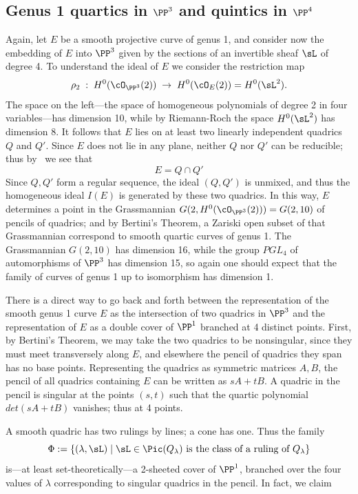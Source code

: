\subsection{Genus 1 quartics in $\PP^3$ and quintics in $\PP^4$} \label{g=1 in P3,P4}

Again, let $E$ be a smooth projective curve of genus 1, and consider now the embedding of $E$ into $\PP^3$ given by the sections of an invertible sheaf $\sL$ of degree 4. To understand the ideal of $E$ we consider the restriction map
$$
\rho_2 \;  : \; H^0(\cO_{\PP^3}(2)) \; \to \; H^0(\cO_{E}(2)) = H^0(\sL^2).
$$
The space on the left---the space of homogeneous polynomials of degree 2 in four variables---has dimension 10, while by Riemann-Roch the space $H^0(\sL^2)$ has dimension 8. It follows that $E$ lies on at least two linearly independent quadrics $Q$ and $Q'$. Since $E$ does not lie in any plane, neither $Q$ nor $Q'$ can be reducible; thus by \bt\ we see that
$$
E = Q \cap Q'
$$
Since $Q,Q'$ form a regular sequence, the ideal $(Q,Q')$ is unmixed, and thus the homogeneous ideal $I(E)$ is generated by
these two quadrics. In this way, $E$ determines a point in the Grassmannian $G(2, H^0(\cO_{\PP^3}(2))) = G(2, 10)$ of pencils of quadrics; and by Bertini's Theorem, a Zariski open subset of that Grassmannian correspond to smooth quartic curves of genus 1. The Grassmannian $G(2,10)$ has dimension 16, while the group $PGL_4$ of automorphisms of $\PP^3$ has dimension 15, so again one should expect that the family of curves of genus 1 up to isomorphism has dimension 1.

There is a direct way to go back and forth between the representation of the smooth genus 1 curve $E$ as the intersection of two quadrics in $\PP^3$ and the representation of $E$ as a double cover
of $\PP^1$ branched at 4 distinct points. First, by Bertini's Theorem, we may take the two quadrics to be nonsingular, since they must meet transversely along $E$, and elsewhere the
pencil of quadrics they span has no base points. Representing the quadrics as symmetric matrices $A,B$, the pencil of all quadrics containing $E$ can be 
written as $sA+tB$. A quadric in the pencil is singular at the points $(s,t)$ such that the quartic polynomial $det(sA+tB)$ vanishes; thus at 4 points.

 A smooth quadric has two rulings by lines; a cone has one. Thus the family
$$
\Phi := \{ (\lambda, \sL) \mid \sL \in \Pic(Q_\lambda) \text{ is the class of a ruling of } Q_\lambda \}
$$
is---at least set-theoretically---a 2-sheeted cover of $\PP^1$, branched over the four values of $\lambda$ corresponding to singular quadrics in the pencil. In fact, we claim

